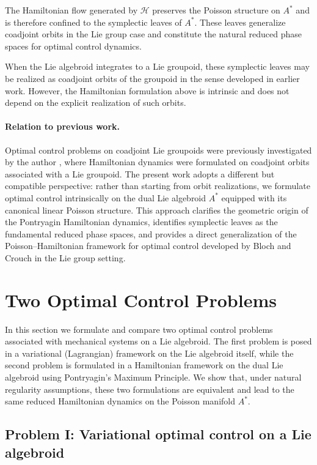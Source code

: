 \documentclass{article}
\begin{document}
The Hamiltonian flow generated by $\mathcal{H}$ preserves the Poisson structure on $A^*$ and is therefore confined to the symplectic leaves of $A^*$.  
These leaves generalize coadjoint orbits in the Lie group case and constitute the natural reduced phase spaces for optimal control dynamics.

When the Lie algebroid integrates to a Lie groupoid, these symplectic leaves may be realized as coadjoint orbits of the groupoid in the sense developed in earlier work.  
However, the Hamiltonian formulation above is intrinsic and does not depend on the explicit realization of such orbits.

\paragraph{Relation to previous work.}
Optimal control problems on coadjoint Lie groupoids were previously investigated by the author \cite{Hagh}, where Hamiltonian dynamics were formulated on coadjoint orbits associated with a Lie groupoid.  
The present work adopts a different but compatible perspective: rather than starting from orbit realizations, we formulate optimal control intrinsically on the dual Lie algebroid $A^*$ equipped with its canonical linear Poisson structure.  
This approach clarifies the geometric origin of the Pontryagin Hamiltonian dynamics, identifies symplectic leaves as the fundamental reduced phase spaces, and provides a direct generalization of the Poisson--Hamiltonian framework for optimal control developed by Bloch and Crouch in the Lie group setting.

\section{Two Optimal Control Problems}

In this section we formulate and compare two optimal control problems associated with mechanical systems on a Lie algebroid.  
The first problem is posed in a variational (Lagrangian) framework on the Lie algebroid itself, while the second problem is formulated in a Hamiltonian framework on the dual Lie algebroid using Pontryagin's Maximum Principle.  
We show that, under natural regularity assumptions, these two formulations are equivalent and lead to the same reduced Hamiltonian dynamics on the Poisson manifold $A^*$.

\subsection{Problem I: Variational optimal control on a Lie algebroid}
\end{document}
